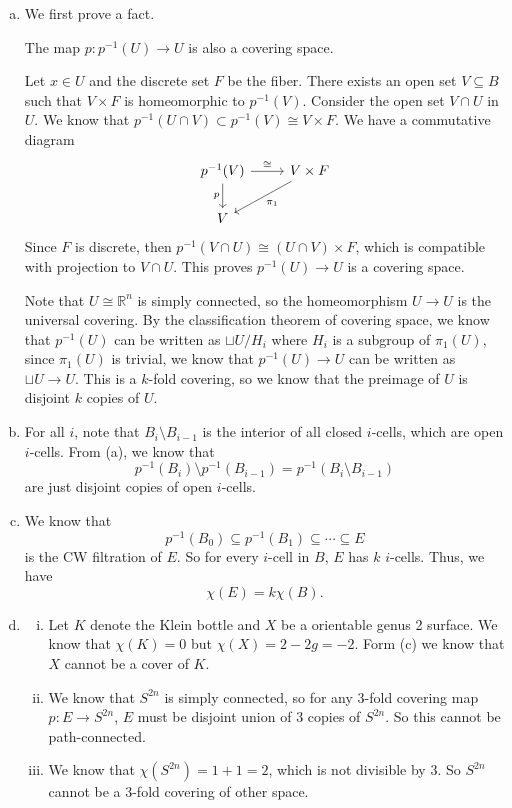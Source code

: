 \documentclass[letterpaper, 12pt]{article}
\begin{document}
\begin{solution}
\begin{enumerate}[(a)]
\item We first prove a fact. 
\begin{claim}
The map \(p:p^{-1}(U)\rightarrow U\) is also a covering space.
\end{claim}
\begin{claimproof}
Let \(x\in U\) and the discrete set \(F\) be the fiber. There exists an open set \(V\subseteq B\) such that \(V\times F\) is homeomorphic to \(p^{-1}(V)\). Consider the open set \(V\cap U\) in \(U\). We know that 
\(p^{-1}(U\cap V)\subset p^{-1}(V)\cong V\times F\). We have a commutative diagram 
\[\begin{tikzcd}
	{p^{-1}(V)} & {V\times F} \\
	V
	\arrow["\cong", from=1-1, to=1-2]
	\arrow["p"', from=1-1, to=2-1]
	\arrow["{\pi_1}", from=1-2, to=2-1]
\end{tikzcd}\]
Since \(F\) is discrete, then \(p^{-1}(V\cap U)\cong (U\cap V)\times F\), which is compatible with projection to \(V\cap U\). This proves \(p^{-1}(U)\rightarrow U\) is a covering space. 
\end{claimproof}

Note that \(U\cong \mathbb{R}^n\) is simply connected, so the homeomorphism \(U\rightarrow U\) is the universal covering. By the classification theorem of covering space, we know that \(p^{-1}(U)\) can be written as \(\sqcup U/H_i\) where \(H_i\) is a subgroup 
of \(\pi_1(U)\), since \(\pi_1(U)\) is trivial, we know that \(p^{-1}(U)\rightarrow U\) can be written as \(\sqcup U\rightarrow U\). This is a \(k\)-fold covering, so we know that the preimage of \(U\) is disjoint \(k\) copies of \(U\).
\item For all \(i\), note that \(B_i\setminus B_{i-1}\) is the interior of all closed \(i\)-cells, which are open \(i\)-cells. From (a), we know that 
\[p^{-1}(B_i)\setminus p^{-1}(B_{i-1})=p^{-1}(B_i\setminus B_{i-1})\]
are just disjoint copies of open \(i\)-cells. 
\item We know that 
\[p^{-1}(B_0)\subseteq p^{-1}(B_1)\subseteq \cdots \subseteq E\]
is the CW filtration of \(E\). So for every \(i\)-cell in \(B\), \(E\) has \(k\) \(i\)-cells. Thus, we have 
\[\chi(E)=k\chi(B).\]
\item \begin{enumerate}[i.]
\item Let \(K\) denote the Klein bottle and \(X\) be a orientable genus 2 surface. We know that 
\(\chi(K)=0\) but \(\chi(X)=2-2g=-2\). 
Form (c) we know that \(X\) cannot be a cover of \(K\). 
\item We know that \(S^{2n}\) is simply connected, so for any 3-fold covering map \(p:E\rightarrow S^{2n}\), \(E\) must be disjoint union of 3 copies of \(S^{2n}\). So this cannot be path-connected. 
\item We know that \(\chi(S^{2n})=1+1=2\), which is not divisible by \(3\). So \(S^{2n}\) cannot be a 3-fold covering of other space.
\end{enumerate}


\end{enumerate}
\end{solution}
\end{document}
